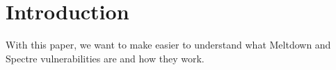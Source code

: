 \section{Introduction}
With this paper, we want to make easier to understand what Meltdown and Spectre vulnerabilities are and how they work.

